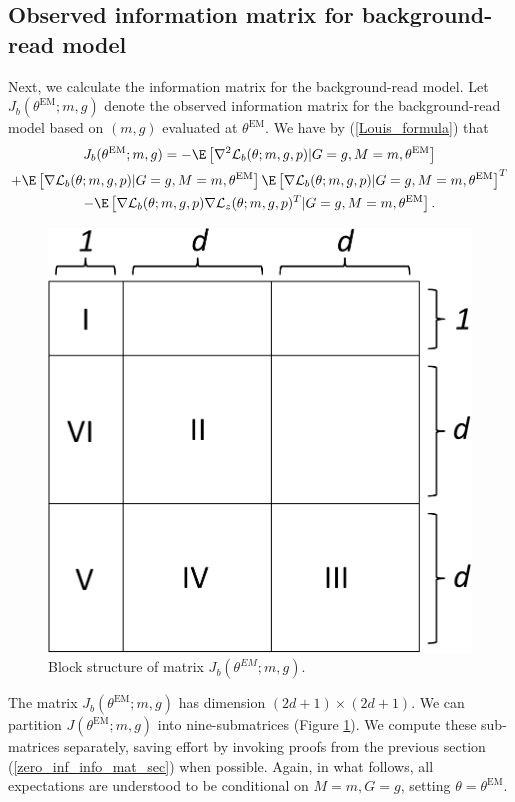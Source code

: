 \documentclass[12pt]{article}
\begin{document}
\subsection{Observed information matrix for background-read model}
 
Next, we calculate the information matrix for the background-read model. Let $J_b(\theta^\textrm{EM}; m, g)$ denote the observed information matrix for the background-read model based on $(m,g)$ evaluated at $\theta^\textrm{EM}.$ We have by (\ref{Louis_formula}) that
\begin{multline*}
J_b(\theta^\textrm{EM}; m, g) = -\E \left[\nabla^2 \mathcal{L}_b(\theta; m, g, p) | G = g, M = m, \theta^\textrm{EM} \right] \\ + \E\left[ \nabla \mathcal{L}_b(\theta; m, g, p) | G = g, M = m, \theta^\textrm{EM} \right] \E\left[ \nabla \mathcal{L}_b(\theta; m, g, p) | G = g, M = m, \theta^\textrm{EM} \right]^T \\ - \E\left[ \nabla\mathcal{L}_b(\theta; m, g, p) \nabla \mathcal{L}_z(\theta; m, g, p)^T | G = g, M = m, \theta^\textrm{EM} \right].
\end{multline*}
\begin{figure}
	\centering
	\includegraphics[width=0.6\linewidth]{fig3_crop}
	\caption{Block structure of matrix $J_b(\theta^{EM}; m, g)$.}
	\label{fig3crop}
\end{figure}
The matrix $J_b(\theta^\textrm{EM}; m, g)$ has dimension $(2d + 1) \times (2d + 1)$. We can partition $J(\theta^\textrm{EM}; m, g)$ into nine-submatrices (Figure \ref{fig3crop}). We compute these sub-matrices separately, saving effort by invoking proofs from the previous section (\ref{zero_inf_info_mat_sec}) when possible. Again, in what follows, all expectations are understood to be conditional on $M = m, G = g$, setting $\theta = \theta^{\textrm{EM}}.$ 
\end{document}
